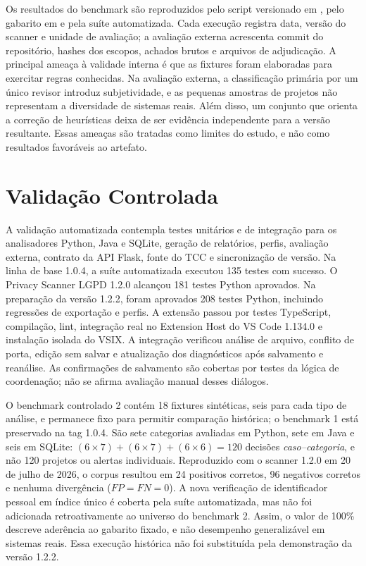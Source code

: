 \documentclass[12pt,a4paper,oneside]{report}
\begin{document}
Os resultados do benchmark são reproduzidos pelo script versionado em , pelo gabarito em  e pela suíte automatizada. Cada execução registra data, versão do scanner e unidade de avaliação; a avaliação externa acrescenta commit do repositório, hashes dos escopos, achados brutos e arquivos de adjudicação. A principal ameaça à validade interna é que as fixtures foram elaboradas para exercitar regras conhecidas. Na avaliação externa, a classificação primária por um único revisor introduz subjetividade, e as pequenas amostras de projetos não representam a diversidade de sistemas reais. Além disso, um conjunto que orienta a correção de heurísticas deixa de ser evidência independente para a versão resultante. Essas ameaças são tratadas como limites do estudo, e não como resultados favoráveis ao artefato.

\section{Validação Controlada}
\label{sec:validacao-controlada}

A validação automatizada contempla testes unitários e de integração para os analisadores Python, Java e SQLite, geração de relatórios, perfis, avaliação externa, contrato da API Flask, fonte do TCC e sincronização de versão. Na linha de base 1.0.4, a suíte automatizada executou 135 testes com sucesso. O Privacy Scanner LGPD 1.2.0 alcançou 181 testes Python aprovados. Na preparação da versão 1.2.2, foram aprovados 208 testes Python, incluindo regressões de exportação e perfis. A extensão passou por testes TypeScript, compilação, lint, integração real no Extension Host do VS Code 1.134.0 e instalação isolada do VSIX. A integração verificou análise de arquivo, conflito de porta, edição sem salvar e atualização dos diagnósticos após salvamento e reanálise. As confirmações de salvamento são cobertas por testes da lógica de coordenação; não se afirma avaliação manual desses diálogos.

O benchmark controlado 2 contém 18 fixtures sintéticas, seis para cada tipo de análise, e permanece fixo para permitir comparação histórica; o benchmark 1 está preservado na tag 1.0.4. São sete categorias avaliadas em Python, sete em Java e seis em SQLite: $(6\times7)+(6\times7)+(6\times6)=120$ decisões \emph{caso--categoria}, e não 120 projetos ou alertas individuais. Reproduzido com o scanner 1.2.0 em 20 de julho de 2026, o corpus resultou em 24 positivos corretos, 96 negativos corretos e nenhuma divergência ($FP=FN=0$). A nova verificação de identificador pessoal em índice único é coberta pela suíte automatizada, mas não foi adicionada retroativamente ao universo do benchmark 2. Assim, o valor de 100\% descreve aderência ao gabarito fixado, e não desempenho generalizável em sistemas reais. Essa execução histórica não foi substituída pela demonstração da versão 1.2.2.
\end{document}
